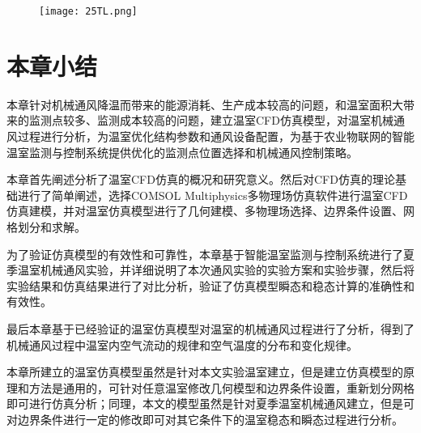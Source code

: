 	\begin{figure}[!htbp]
		\centering
		\texttt{[image: 25TL.png]}
	\end{figure}
	
\section{本章小结}
本章针对机械通风降温而带来的能源消耗、生产成本较高的问题，和温室面积大带来的监测点较多、监测成本较高的问题，建立温室CFD仿真模型，对温室机械通风过程进行分析，为温室优化结构参数和通风设备配置，为基于农业物联网的智能温室监测与控制系统提供优化的监测点位置选择和机械通风控制策略。

本章首先阐述分析了温室CFD仿真的概况和研究意义。然后对CFD仿真的理论基础进行了简单阐述，选择COMSOL Multiphysics多物理场仿真软件进行温室CFD仿真建模，并对温室仿真模型进行了几何建模、多物理场选择、边界条件设置、网格划分和求解。

为了验证仿真模型的有效性和可靠性，本章基于智能温室监测与控制系统进行了夏季温室机械通风实验，并详细说明了本次通风实验的实验方案和实验步骤，然后将实验结果和仿真结果进行了对比分析，验证了仿真模型瞬态和稳态计算的准确性和有效性。

最后本章基于已经验证的温室仿真模型对温室的机械通风过程进行了分析，得到了机械通风过程中温室内空气流动的规律和空气温度的分布和变化规律。

本章所建立的温室仿真模型虽然是针对本文实验温室建立，但是建立仿真模型的原理和方法是通用的，可针对任意温室修改几何模型和边界条件设置，重新划分网格即可进行仿真分析；同理，本文的模型虽然是针对夏季温室机械通风建立，但是可对边界条件进行一定的修改即可对其它条件下的温室稳态和瞬态过程进行分析。